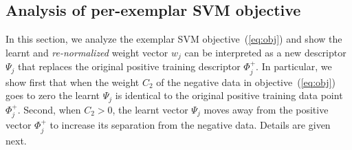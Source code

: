 \documentclass[10pt,twocolumn,letterpaper]{article}
\begin{document}
   \subsection{Analysis of per-exemplar SVM objective} %
      In this section, we analyze the exemplar SVM objective~(\ref{eq:obj}) and show the learnt and {\em re-normalized} weight vector $w_j$ can be interpreted as a new descriptor $\Psi_j$ that replaces the original positive training descriptor $\Phi^+_j$.  In particular, we show first that when the weight $C_2$ of the negative data in objective~(\ref{eq:obj}) goes to zero the learnt $\Psi_j$ is identical to the original positive training data point $\Phi_j^+$.  Second, when $C_2>0$, the learnt vector $\Psi_j$ moves away from the positive vector  $\Phi_j^+$ to increase its separation from the negative data.
      Details are given next.
\end{document}
